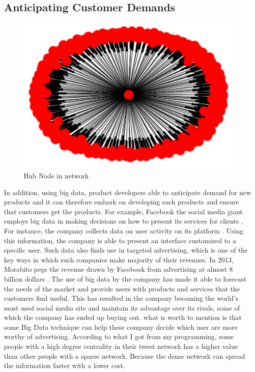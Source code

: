 \documentclass[sigconf]{acmart}
\begin{document}
\subsection{Anticipating Customer Demands}
\begin{figure}[!ht]
  \centering\includegraphics[width=\columnwidth]{images/single hub node with high in-degree.png}
  \caption{Hub Node in network }
  \label{Figure 2}
\end{figure}
In addition, using big data, product developers able to anticipate demand for new products and it can therefore embark on developing such products and ensure that customers get the products. For example, Facebook the social media giant employs big data in making decisions on how to present its services for clients \cite{Morabito2015}. For instance, the company collects data on user activity on its platform \cite{Morabito2015}. Using this information, the company is able to present an interface customized to a specific user. Such data also finds use in targeted advertising, which is one of the key ways in which such companies make majority of their revenues. In 2013, Morabito pegs the revenue drawn by Facebook from advertising at almost  8 billion dollars \cite{Morabito2015}. The use of big data by the company has made it able to forecast the needs of the market and provide users with products and services that the customers find useful. This has resulted in the company becoming the world’s most used social media site and maintain its advantage over its rivals, some of which the company has ended up buying out. what is worth to mention is that some Big Data technique can help these company decide which user are more worthy of advertising. According to what I got from my programming, some people with a high degree centrality in their tweet network has a higher value than other people with a sparse network. Because the dense network can spread the information faster with a lower cost.
\end{document}
